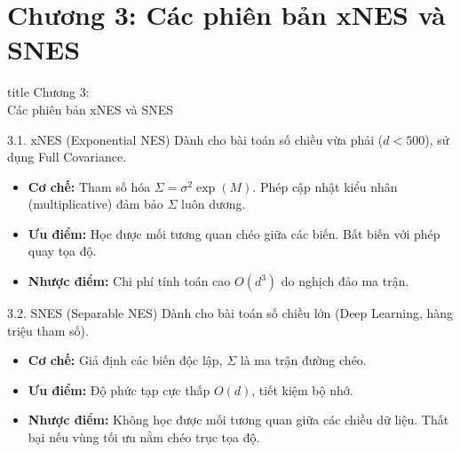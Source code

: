 \documentclass[10pt,xcolor=dvipsnames]{beamer}
\begin{document}
	\section{Chương 3: Các phiên bản xNES và SNES}
	
	\begin{frame}
		\centering
		\begin{beamercolorbox}[sep=16pt,center,shadow=true,rounded=true]{title}
			\huge Chương 3:\\[0.5em] Các phiên bản xNES và SNES \par
		\end{beamercolorbox}
	\end{frame}
	
	\begin{frame}{3.1. xNES (Exponential NES)}
		Dành cho bài toán số chiều vừa phải ($d < 500$), sử dụng Full Covariance.
		\begin{itemize}
			\item \textbf{Cơ chế:} Tham số hóa $\Sigma = \sigma^2 \exp(M)$. Phép cập nhật kiểu nhân (multiplicative) đảm bảo $\Sigma$ luôn dương.
			\item \textbf{Ưu điểm:} Học được mối tương quan chéo giữa các biến. Bất biến với phép quay tọa độ.
			\item \textbf{Nhược điểm:} Chi phí tính toán cao $O(d^3)$ do nghịch đảo ma trận.
		\end{itemize}
	\end{frame}
	
	\begin{frame}{3.2. SNES (Separable NES)}
		Dành cho bài toán số chiều lớn (Deep Learning, hàng triệu tham số).
		\begin{itemize}
			\item \textbf{Cơ chế:} Giả định các biến độc lập, $\Sigma$ là ma trận đường chéo.
			\item \textbf{Ưu điểm:} Độ phức tạp cực thấp $O(d)$, tiết kiệm bộ nhớ.
			\item \textbf{Nhược điểm:} Không học được mối tương quan giữa các chiều dữ liệu. Thất bại nếu vùng tối ưu nằm chéo trục tọa độ.
		\end{itemize}
	\end{frame}
	
\end{document}

